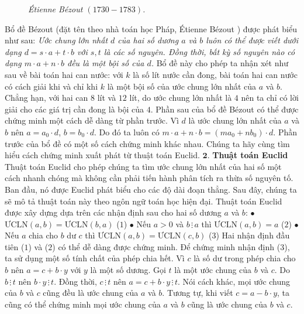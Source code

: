 \begin{multicols}{2}
\begin{figure}[H]
		\caption{\small\textit{\color{hoccungpi}Étienne Bézout $(1730 - 1783)$.}}
		\vspace*{-10pt}
	\end{figure}
	Bổ đề Bézout (đặt tên theo nhà toán học Pháp, Étienne Bézout ) được phát biểu như sau:
	\vskip 0.1cm
	\textit{Ước chung lớn nhất $d$ của hai số dương $a$ và $b$ luôn có thể được viết dưới dạng $d=s\cdot a+t\cdot b$ với $s,t$ là các số nguyên. Đồng thời, bất kỳ số nguyên nào có dạng $m\cdot a+n\cdot b$ đều là một bội số của $d$.}
	\vskip 0.1cm
	Bổ đề này cho phép ta nhận xét như sau về bài toán hai can nước: với $k$ là số lít nước cần đong, bài toán hai can nước có cách giải khi và chỉ khi $k$ là một bội số của ước chung lớn nhất của $a$ và $b$. Chẳng hạn, với hai can $8$ lít và $12$ lít, do ước chung lớn nhất là $4$ nên ta chỉ có lời giải cho các giá trị cần đong là bội của $4$.
	\vskip 0.1cm 
	Phần sau của bổ đề Bézout có thể được chứng minh một cách dễ dàng từ phần trước. Vì $d$ là ước chung lớn nhất của $a$ và $b$ nên $a=a_0\cdot d$, $b=b_0\cdot d$. Do đó ta luôn có $m\cdot a+n\cdot b=(ma_0+nb_0)\cdot d$.
	\vskip 0.1cm
	Phần trước của bổ đề có một số cách chứng minh khác nhau. Chúng ta hãy cùng tìm hiểu cách chứng minh xuất phát từ thuật toán Euclid. 
	\vskip 0.1cm
	$\pmb{2.}$ \textbf{\color{hoccungpi}Thuật toán Euclid}
	\vskip 0.1cm
	Thuật toán Euclid cho phép chúng ta tìm ước chung lớn nhất của hai số một cách nhanh chóng mà không cần phải tiến hành phân tích ra thừa số nguyên tố. Ban đầu, nó được Euclid phát biểu cho các độ dài đoạn thẳng. Sau đây, chúng ta sẽ mô tả thuật toán này theo ngôn ngữ toán học hiện đại.
	\vskip 0.1cm
	Thuật toán Euclid được xây dựng dựa trên các nhận định sau cho hai số dương $a$ và $b$:
	\vskip 0.1cm
	$\bullet$ $\text{ƯCLN}(a,b) = \text{ƯCLN}(b,a)$					\hfill ($1$)
	\vskip 0.1cm
	$\bullet$ Nếu $a>0$ và $b \,\vdots \,a$ thì $\text{ƯCLN}(a,b) = a$			\hfill ($2$)
	\vskip 0.1cm
	$\bullet$ Nếu $a$ chia cho $b$ dư $c$ thì $\text{ƯCLN}(a,b) = \text{ƯCLN}(c,b)$		\hfill ($3$)
	\vskip 0.1cm
	Hai nhận định đầu tiên ($1$) và ($2$) có thể dễ dàng được chứng minh. Để chứng minh nhận định ($3$), ta sử dụng một số tính chất của phép chia hết. 
	\vskip 0.1cm
	Vì $c$ là số dư trong phép chia cho $b$ nên $a=c+b\cdot y$ với $y$ là một số dương. Gọi $t$ là một ước chung của $b$ và $c$. Do $b\,\vdots\, t$ nên $b\cdot y\, \vdots\,t$. Đồng thời, $c\,\vdots\,t$ nên $a=c+b\cdot y\,\vdots\,t$. Nói cách khác, mọi ước chung của $b$ và $c$ cũng đều là ước chung của $a$ và $b$. 
	\vskip 0.1cm
	Tương tự, khi viết $c=a-b\cdot y$, ta cũng có thể chứng minh mọi ước chung của $a$ và $b$ cũng là ước chung của $b$ và $c$. 

\end{multicols}
